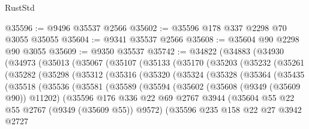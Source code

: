 \begin{lexlean}{RustStd}
\begin{coremodule}
@35596 := @9496 @35537 @2566
@35602 := @35596 @178 @337 @2298 @70 @3055 @35055
@35604 := @9341 @35537 @2566
@35608 := @35604 @90 @2298 @90 @3055
@35609 := @9350 @35537
@35742 := @34822
    (@34883
      (@34930
        (@34973
          (@35013
            (@35067
              (@35107
                (@35133
                  (@35170
                    (@35203
                      (@35232
                        (@35261
                          (@35282
                            (@35298
                              (@35312
                                (@35316
                                  (@35320
                                    (@35324
                                      (@35328
                                        (@35364
                                          (@35435
                                            (@35518
                                              (@35536
                                                (@35581
                                                  (@35589
                                                    (@35594
                                                      (@35602
                                                        (@35608 (@9349 (@35609 @90)) @11202)
                                                        (@35596
                                                          @176
                                                          @336
                                                          @22
                                                          @69
                                                          @2767
                                                          @3944
                                                          (@35604
                                                            @55
                                                            @22
                                                            @55
                                                            @2767
                                                            (@9349 (@35609 @55))
                                                            @9572)
                                                          (@35596
                                                            @235
                                                            @158
                                                            @22
                                                            @27
                                                            @3942
                                                            @2727

\end{coremodule}
\end{lexlean}
